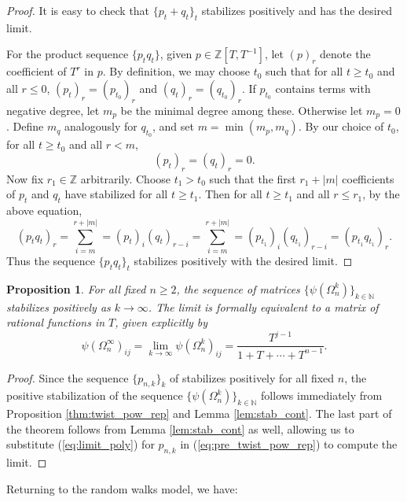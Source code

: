 \documentclass[11pt,hyp,]{nyjm}
\newcommand{\Z}{\mathbb{Z}}
\newcommand{\N}{\mathbb{N}}
\numberwithin{thm}{section}
\newtheorem{prop}[thm]{Proposition}
\theoremstyle{definition}
\theoremstyle{remark}
\begin{document}
	\begin{proof}
		It is easy to check that $\{p_t + q_t\}_t$ stabilizes positively and has the desired limit.
		
		For the product sequence $\{p_tq_t\}$, given $p \in \Z[T,T^{-1}]$, let $(p)_r$ denote the coefficient of $T^r$ in $p$. By definition, we may choose $t_0$ such that for all $t \geq t_0$ and all $r \leq 0$, $(p_t)_r = (p_{t_0})_r$ and $(q_t)_r = (q_{t_0})_r$. If $p_{t_0}$ contains terms with negative degree, let $m_p$ be the minimal degree among these. Otherwise let $m_p = 0$. Define $m_q$ analogously for $q_{t_0}$, and set $m = \min(m_p,m_q)$. By our choice of $t_0$, for all $t \geq t_0$ and all $r < m$,
		$$
		(p_t)_r = (q_t)_r = 0.
		$$
		Now fix $r_1 \in \Z$ arbitrarily. Choose $t_1 > t_0$ such that the first $r_1 + |m|$ coefficients of $p_t$ and $q_t$ have stabilized for all $t \geq t_1$. Then for all $t \geq t_1$ and all $r \leq r_1$, by the above equation,
		$$
		(p_tq_t)_r = \sum_{i = m}^{r + |m|} = (p_t)_i(q_t)_{r - i} = \sum_{i = m}^{r + |m|} = (p_{t_1})_i(q_{t_1})_{r - i} = (p_{t_1}q_{t_1})_r.
		$$
		Thus the sequence $\{p_tq_t\}_t$ stabilizes positively with the desired limit.
	\end{proof}
	
	\begin{prop}
		\label{thm:twist_stab}
		For all fixed $n \geq 2$, the sequence of matrices $\{\psi(\Omega_n^k)\}_{k \in \N}$ stabilizes positively as $k \to \infty$. The limit is formally equivalent to a matrix of rational functions in $T$, given explicitly by
		\begin{equation}
			\label{eq:inf_prob}
			\psi(\Omega^\infty_n)_{ij} = \lim_{k \to \infty} \psi(\Omega_n^k)_{ij} = \frac{T^{j - 1}}{1 + T + \cdots + T^{n - 1}}.
		\end{equation}
	\end{prop}

	\begin{proof}
		Since the sequence $\{p_{n,k}\}_k$ of  stabilizes positively for all fixed $n$, the positive stabilization of the sequence $\{\psi(\Omega_n^k)\}_{k \in \N}$ follows immediately from Proposition \ref{thm:twist_pow_rep} and Lemma \ref{lem:stab_cont}. The last part of the theorem follows from Lemma \ref{lem:stab_cont} as well, allowing us to substitute (\ref{eq:limit_poly}) for $p_{n,k}$ in (\ref{eq:pre_twist_pow_rep}) to compute the limit.
	\end{proof}

	Returning to the random walks model, we have:
	
\end{document}

